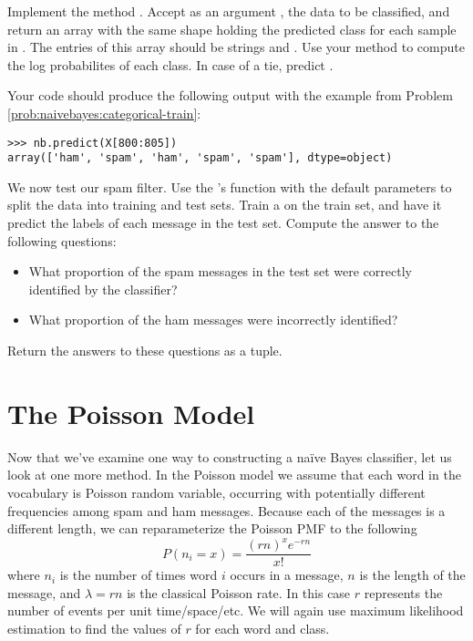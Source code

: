 \begin{problem}\label{NB:prob_log}
Implement the method .
Accept as an argument , the data to be classified, and return an array with the same shape holding the predicted class for each sample in .
The entries of this array should be strings  and .
Use your method  to compute the log probabilites of each class.
In case of a tie, predict .

Your code should produce the following output with the example from Problem \ref{prob:naivebayes:categorical-train}:
\begin{lstlisting}
>>> nb.predict(X[800:805])
array(['ham', 'spam', 'ham', 'spam', 'spam'], dtype=object)
\end{lstlisting}
\end{problem}

\begin{problem}
We now test our spam filter.
Use the 's  function with the default parameters to split the data into training and test sets.
Train a  on the train set, and have it predict the labels of each message in the test set.
Compute the answer to the following questions:
\begin{itemize}
\item What proportion of the spam messages in the test set were correctly identified by the classifier?
\item What proportion of the ham messages were incorrectly identified?
\end{itemize}
Return the answers to these questions as a tuple.
\end{problem}

\section*{The Poisson Model}
Now that we've examine one way to constructing a naïve Bayes classifier, let us look at one more method.
In the Poisson model we assume that each word in the vocabulary is Poisson random variable, occurring with potentially different frequencies among spam and ham messages.
Because each of the messages is a different length, we can reparameterize the Poisson PMF to the following
\begin{equation}\label{eq:poisson}
    P(n_i = x) = \frac{(rn)^xe^{-rn}}{x!}
\end{equation}
where $n_i$ is the number of times word $i$ occurs in a message, $n$ is the length of the message, and $\lambda = rn$ is the classical Poisson rate.
In this case $r$ represents the number of events per unit time/space/etc.
We will again use maximum likelihood estimation to find the values of $r$ for each word and class.


